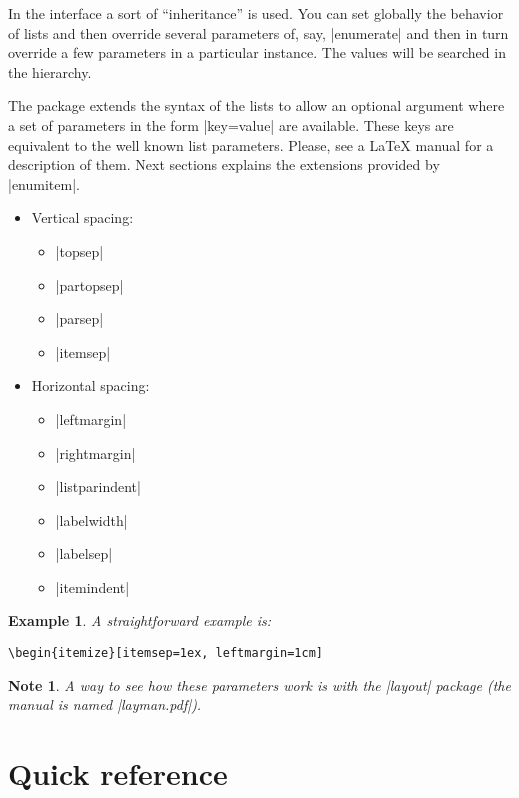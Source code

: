\documentclass[a4paper]{ltxguide}
\newtheorem{note}{Note}
\newtheorem{example}{Example}
\begin{document}
In the interface a sort of ``inheritance'' is used. You can set
globally the behavior of lists and then override several parameters of,
say, |enumerate| and then in turn override a few parameters in a
particular instance. The values will be searched in the hierarchy.

The package extends the syntax of the lists to allow an optional
argument where a set of parameters in the form |key=value| are
available. These keys are equivalent to the well known list parameters.
Please, see a \LaTeX{} manual for a description of them. Next sections
explains the extensions provided by |enumitem|.
\begin{itemize}
\item
Vertical spacing:
\begin{itemize}
\setlength{\itemsep}{0pt}
\item |topsep|
\item |partopsep|
\item |parsep|
\item |itemsep|
\end{itemize}
\item
Horizontal spacing:
\begin{itemize}
\setlength{\itemsep}{0pt}
\item |leftmargin|
\item |rightmargin|
\item |listparindent|
\item |labelwidth|
\item |labelsep|
\item |itemindent|
\end{itemize}
\end{itemize}

\begin{example}
  A straightforward example is:
\begin{verbatim}
\begin{itemize}[itemsep=1ex, leftmargin=1cm]
\end{verbatim}
\end{example}

\begin{note}
  A way to see how these parameters work is with the |layout| package
  (the manual is named |layman.pdf|).
\end{note}

\section{Quick reference}
\end{document}
